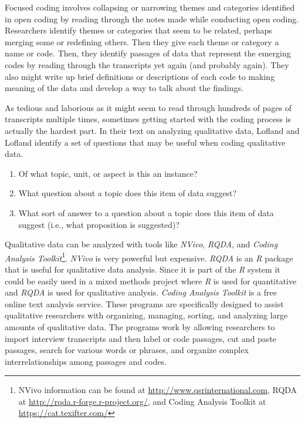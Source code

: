 Focused coding involves collapsing or narrowing themes and categories identified in open coding by reading through the notes made while conducting open coding. Researchers identify themes or categories that seem to be related, perhaps merging some or redefining others. Then they give each theme or category a name or code. Then, they identify passages of data that represent the emerging codes by reading through the transcripts yet again (and probably again). They also might write up brief definitions or descriptions of each code to making meaning of the data and develop a way to talk about the findings.

As tedious and laborious as it might seem to read through hundreds of pages of transcripts multiple times, sometimes getting started with the coding process is actually the hardest part. In their text on analyzing qualitative data, Lofland and Lofland \cite{lofland1995analytic} identify a set of questions that may be useful when coding qualitative data.

\begin{enumerate}
	\item Of what topic, unit, or aspect is this an instance?
	\item What question about a topic does this item of data suggest?
	\item What sort of answer to a question about a topic does this item of data suggest (i.e., what proposition is suggested)?
\end{enumerate}

Qualitative data can be analyzed with tools like \textit{NVivo}, \textit{RQDA}, and \textit{Coding Analysis Toolkit}\footnote{NVivo information can be found at \url{http://www.qsrinternational.com}, RQDA at \url{http://rqda.r-forge.r-project.org/}, and Coding Analysis Toolkit at \url{https://cat.texifter.com/}}. \textit{NVivo} is very powerful but expensive. \textit{RQDA} is an \textit{R} package that is useful for qualitative data analysis. Since it is part of the \textit{R} system it could be easily used in a mixed methods project where \textit{R} is used for quantitative and \textit{RQDA} is used for qualitative analysis. \textit{Coding Analysis Toolkit} is a free online text analysis service. These programs are specifically designed to assist qualitative researchers with organizing, managing, sorting, and analyzing large amounts of qualitative data. The programs work by allowing researchers to import interview transcripts and then label or code passages, cut and paste passages, search for various words or phrases, and organize complex interrelationships among passages and codes.

